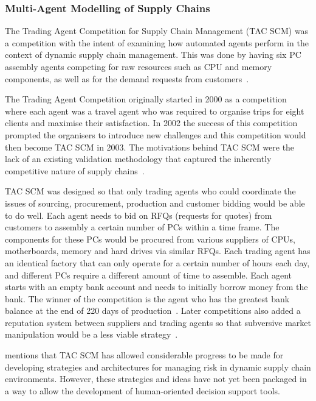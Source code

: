 \subsubsection{Multi-Agent Modelling of Supply Chains}

The Trading Agent Competition for Supply Chain Management (TAC SCM) was a competition with the intent of examining how automated agents perform in the context of dynamic supply chain management.
This was done by having six PC assembly agents competing for raw resources such as CPU and memory components, as well as for the demand requests from customers~\cite{sadeh2003tac}.

The Trading Agent Competition originally started in 2000 as a competition where each agent was a travel agent who was required to organise trips for eight clients and maximise their satisfaction.
In 2002 the success of this competition prompted the organisers to introduce new challenges and this competition would then become TAC SCM in 2003.
The motivations behind TAC SCM were the lack of an existing validation methodology that captured the inherently competitive nature of supply chains~\cite{arunachalam2005supply}.

TAC SCM was designed so that only trading agents who could coordinate the issues of sourcing, procurement, production and customer bidding would be able to do well.
Each agent needs to bid on RFQs (requests for quotes) from customers to assembly a certain number of PCs within a time frame.
The components for these PCs would be procured from various suppliers of CPUs, motherboards, memory and hard drives via similar RFQs.
Each trading agent has an identical factory that can only operate for a certain number of hours each day, and different PCs require a different amount of time to assemble.
Each agent starts with an empty bank account and needs to initially borrow money from the bank.
The winner of the competition is the agent who has the greatest bank balance at the end of 220 days of production~\cite{arunachalam2005supply}.
Later competitions also added a reputation system between suppliers and trading agents so that subversive market manipulation would be a less viable strategy~\cite{collins2010pushing}.

 mentions that TAC SCM has allowed considerable pro\-gress to be made for developing strategies and architectures for managing risk in dynamic supply chain environments.
However, these strategies and ideas have not yet been packaged in a way to allow the development of human-oriented decision support tools.

